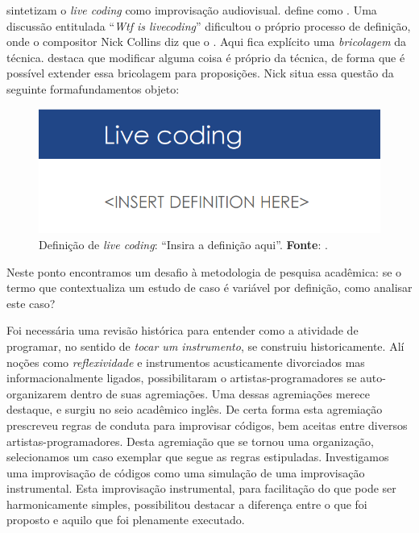  sintetizam o \emph{live coding} como improvisação audiovisual.  define como . Uma discussão entitulada ``\emph{Wtf is livecoding}'' dificultou o próprio processo de definição, onde o compositor Nick Collins diz que o . Aqui fica explícito uma \emph{bricolagem} da técnica.  destaca que modificar alguma coisa é próprio da técnica, de forma que é possível extender essa bricolagem para proposições. Nick  situa essa questão da seguinte formafundamentos objeto:

  \begin{figure}[h]
    \centering
    \includegraphics[scale=0.7]{imagens/live_coding_def.png}
    \caption{Definição de \emph{live coding}: ``Insira a definição aqui''. \textbf{Fonte}: .}
    \label{fig:live_coding_def}
  \end{figure}

Neste ponto encontramos um desafio à metodologia de pesquisa acadêmica: se o termo que contextualiza um estudo de caso é variável por definição, como analisar este caso? 

Foi necessária uma revisão histórica para entender como a atividade de programar, no sentido de \emph{tocar um instrumento}, se construiu historicamente. Alí noções como \emph{reflexividade} e instrumentos acusticamente divorciados mas informacionalmente ligados, possibilitaram o artistas-programadores se auto-organizarem dentro de suas agremiações. Uma dessas agremiações merece destaque, e surgiu no seio acadêmico inglês. De certa forma esta agremiação prescreveu regras de conduta para improvisar códigos, bem aceitas entre diversos artistas-programadores. Desta agremiação que se tornou uma organização, selecionamos um caso exemplar que segue as regras estipuladas. Investigamos uma improvisação de códigos como uma simulação de uma improvisação instrumental. Esta improvisação instrumental, para facilitação do que pode ser harmonicamente simples, possibilitou destacar a diferença entre o que foi proposto e aquilo que foi plenamente executado.

